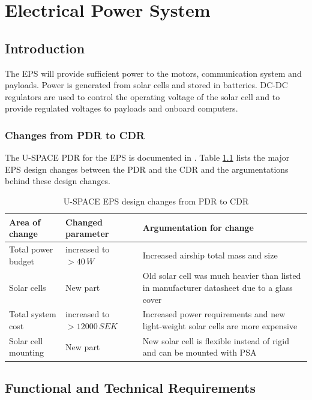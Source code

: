 \chapter{Electrical Power System}
\label{chap:eps}

\section{Introduction}
\label{sec:introduction}

The \ac{EPS} will provide sufficient power to the motors, communication system and payloads. Power is generated from solar cells and stored in batteries. DC-DC regulators are used to control the operating voltage of the solar cell and to provide regulated voltages to payloads and onboard computers.
%
\subsection{Changes from PDR to CDR}
\label{sec:changes_pdr_to_cdr}
%
The U-SPACE \ac{PDR} for the \ac{EPS} is documented in \cite{PDR}. Table \ref{tab:pdr_to_cdr} lists the major \ac{EPS} design changes between the \ac{PDR} and the \ac{CDR} and the argumentations behind these design changes.

\begin{table}[H]
\centering
\caption{U-SPACE \ac{EPS} design changes from PDR to CDR}
\label{tab:pdr_to_cdr}
\begin{tabular}{p{}p{}p{}}
\hline
\textbf{Area of change }& \textbf{Changed parameter }& \textbf{Argumentation for change}\\
\hline
Total power budget & increased to $>40\,W$ & Increased airship total mass and size\\
Solar cells & New part & Old solar cell was much heavier than listed in manufacturer datasheet due to a glass cover\\
Total system cost & increased to $>12000\,SEK$ & Increased power requirements and new light-weight solar cells are more expensive\\
Solar cell mounting & New part & New solar cell is flexible instead of rigid and can be mounted with \ac{PSA}\\
\hline
\end{tabular}
\end{table} 

\section{Functional and Technical Requirements}

